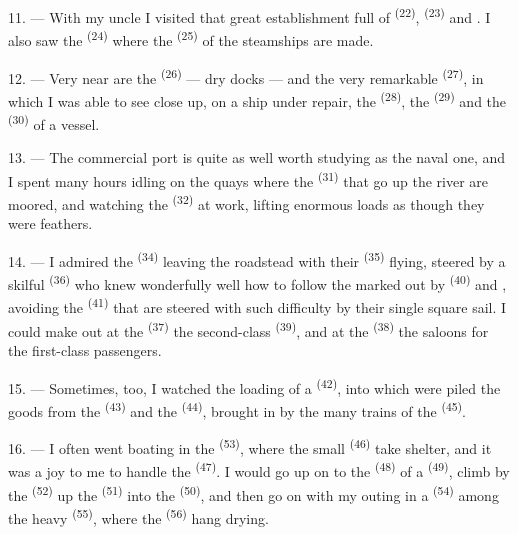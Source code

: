 11. --- With my uncle I visited that great establishment full of
 \textsuperscript{(22)},  \textsuperscript{(23)} and
. I also saw the  \textsuperscript{(24)} where the
 \textsuperscript{(25)} of the steamships are made.

12. --- Very near are the  \textsuperscript{(26)} --- dry docks --- and
the very remarkable  \textsuperscript{(27)}, in which I was
able to see close up, on a ship under repair, the 
\textsuperscript{(28)}, the  \textsuperscript{(29)} and the 
\textsuperscript{(30)} of a vessel.

13. --- The commercial port is quite as well worth studying as the naval
one, and I spent many hours idling on the quays where the
 \textsuperscript{(31)} that go up the river are moored, and
watching the  \textsuperscript{(32)} at work, lifting
enormous loads as though they were feathers.

\VUsaut{4.0mm}
\VUsaut{3.0mm}

14. --- I admired the  \textsuperscript{(34)} leaving the
roadstead with their  \textsuperscript{(35)} flying, steered by a skilful
 \textsuperscript{(36)} who knew wonderfully well how to follow the
 marked out by  \textsuperscript{(40)} and
, avoiding the  \textsuperscript{(41)} that are steered
with such difficulty by their single square sail. I could make out at the
 \textsuperscript{(37)} the second-class  \textsuperscript{(39)},
and at the  \textsuperscript{(38)} the saloons for the first-class
passengers.

15. --- Sometimes, too, I watched the loading of a 
\textsuperscript{(42)}, into which were piled the goods from the 
\textsuperscript{(43)} and the  \textsuperscript{(44)}, brought in by
the many trains of the  \textsuperscript{(45)}.

\VUsaut{3.0mm}
\VUsaut{3.0mm}

16. --- I often went boating in the  \textsuperscript{(53)}, where the
small  \textsuperscript{(46)} take shelter, and it was a joy to me to
handle the  \textsuperscript{(47)}. I would go up on to the 
\textsuperscript{(48)} of a  \textsuperscript{(49)}, climb by the
 \textsuperscript{(52)} up the  \textsuperscript{(51)}
into the  \textsuperscript{(50)}, and then go on with my outing in a
 \textsuperscript{(54)} among the heavy 
\textsuperscript{(55)}, where the  \textsuperscript{(56)} hang drying.

